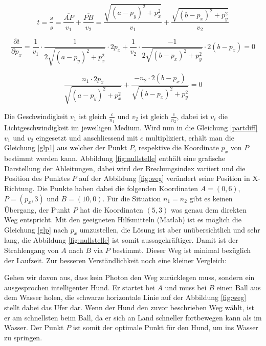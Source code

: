 \begin{refsection}
\begin{equation}\label{tbest}
t=\dfrac{s}{s}=\dfrac{\overline{AP}}{v_{1}}+\dfrac{\overline{PB}}{v_{2}}= 
\dfrac{\sqrt{(a-p_{y})^{2}+p_{x}^{2}}}{v_{1}}+ 
\dfrac{\sqrt{(b-p_{x})^{2}+p_{y}^{2}}}{v_{2}}
\end{equation}

\begin{equation}\label{partdiff}
\dfrac{\partial t}{\partial p_{x}}=
\dfrac{1}{v_{1}}\cdot \dfrac{1}{2 \sqrt{(a-p_{y})^{2}+p_{x}^{2}}}\cdot 2p_{x} +
\dfrac{1}{v_{2}}\cdot \dfrac{-1}{2 \sqrt{(b-p_{x})^{2}+p_{y}^{2}}}\cdot 2(b-p_{x})= 0
\end{equation}

\begin{equation}\label{glp}
\dfrac{n_{1}\cdot 2p_{x} }{\sqrt{(a-p_{y})^{2}+p_{x}^{2}}}+
\dfrac{-n_{2}\cdot 2(b-p_{x})}{\sqrt{(b-p_{x})^{2}+p_{y}^{2}}}= 0
\end{equation}

Die Geschwindigkeit $ v_{1}$ ist gleich $\frac{c}{n_{1}} $ und $ v_{2}$ ist gleich $\frac{c}{n_{2}}$, dabei ist $v_{i}$ die Lichtgeschwindigkeit im jeweiligen Medium. Wird nun in die Gleichung \eqref{partdiff} $ v_{1}$ und $ v_{2}$ eingesetzt und anschliessend mit $c$ multipliziert, erhält man die Gleichung \eqref{glp1} aus welcher der Punkt $P$, respektive die Koordinate $p_{x}$ von $P$ bestimmt werden kann.
Abbildung \ref{fig:nullstelle} enthält eine grafische Darstellung der Ableitungen, dabei wird der Brechungsindex variiert und die Position des Punktes $P$ auf der Abbildung \ref{fig:weg} verändert seine Position in X-Richtung. Die  Punkte haben dabei die folgenden Koordinaten $A = (0,6)$, $P=(p_{x},3)$ und $B=(10,0)$. Für die Situation $n_{1}=n_{2}$ gibt es keinen Übergang, der Punkt $P$ hat die Koordinaten $(5,3)$ was genau dem direkten Weg entspricht. Mit den geeigneten Hilfsmitteln (Matlab) ist es möglich die Gleichung \eqref{glp} nach $p_{x}$ umzustellen, die Lösung ist aber unübersichtlich und sehr lang, die Abbildung \ref{fig:nullstelle} ist somit aussagekräftiger.
Damit ist der Strahlengang von $A$ nach $B$ via $P$ bestimmt. Dieser Weg ist minimal bezüglich der Laufzeit. \newline
Zur besseren Verständlichkeit noch eine kleiner Vergleich:

Gehen wir davon aus, dass kein Photon den Weg zurücklegen muss, sondern ein ausgesprochen intelligenter Hund. Er startet bei $A$ und muss bei $B$ einen Ball aus dem Wasser holen, die schwarze horizontale Linie auf der Abbildung \ref{fig:weg} stellt dabei das Ufer dar. Wenn der Hund den zuvor beschrieben Weg wählt, ist er am schnellsten beim Ball, da er sich an Land schneller fortbewegen kann als im Wasser. Der Punkt $P$ ist somit der optimale Punkt für den Hund, um ins Wasser zu springen.


\end{refsection}

